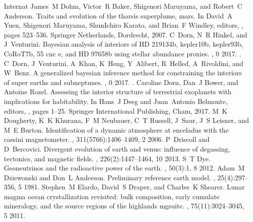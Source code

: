 \documentclass[letterpaper,10pt,english]{jupyterBook}
\begin{document}
\begin{sphinxthebibliography}{Internat}
\sphinxAtStartPar
James M Dohm, Victor R Baker, Shigenori Maruyama, and Robert C Anderson. Traits and evolution of the tharsis superplume, mars. In David A Yuen, Shigenori Maruyama, Shun\sphinxhyphen{}Ichiro Karato, and Brian F Windley, editors, , pages 523–536. Springer Netherlands, Dordrecht, 2007.
\sphinxAtStartPar
C Dorn, N R Hinkel, and J Venturini. Bayesian analysis of interiors of HD 219134b, kepler\sphinxhyphen{}10b, kepler\sphinxhyphen{}93b, CoRoT\sphinxhyphen{}7b, 55 cnc e, and HD 97658b using stellar abundance proxies. , 0 2017. .
\sphinxAtStartPar
C Dorn, J Venturini, A Khan, K Heng, Y Alibert, R Helled, A Rivoldini, and W Benz. A generalized bayesian inference method for constraining the interiors of super earths and sub\sphinxhyphen{}neptunes. , 0 2017. .
\sphinxAtStartPar
Caroline Dorn, Dan J Bower, and Antoine Rozel. Assessing the interior structure of terrestrial exoplanets with implications for habitability. In Hans J Deeg and Juan Antonio Belmonte, editors, , pages 1–25. Springer International Publishing, Cham, 2017.
\sphinxAtStartPar
M K Dougherty, K K Khurana, F M Neubauer, C T Russell, J Saur, J S Leisner, and M E Burton. Identification of a dynamic atmosphere at enceladus with the cassini magnetometer. , 311(5766):1406–1409, 2 2006.
\sphinxAtStartPar
P Driscoll and D Bercovici. Divergent evolution of earth and venus: influence of degassing, tectonics, and magnetic fields. , 226(2):1447–1464, 10 2013.
\sphinxAtStartPar
S T Dye. Geoneutrinos and the radioactive power of the earth. , 50(3):1, 8 2012.
\sphinxAtStartPar
Adam M Dziewonski and Don L Anderson. Preliminary reference earth model. , 25(4):297–356, 5 1981.
\sphinxAtStartPar
Stephen M Elardo, David S Draper, and Charles K Shearer. Lunar magma ocean crystallization revisited: bulk composition, early cumulate mineralogy, and the source regions of the highlands mg\sphinxhyphen{}suite. , 75(11):3024–3045, 5 2011.

\end{sphinxthebibliography}
\end{document}
